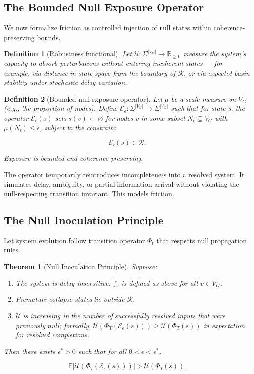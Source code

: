 \documentclass[11pt]{article}
\newtheorem{theorem}{Theorem}
\newtheorem{definition}{Definition}
\theoremstyle{remark}
\begin{document}
\subsection{The Bounded Null Exposure Operator}

We now formalize friction as controlled injection of null states within coherence-preserving bounds.

\begin{definition}[Robustness functional]
Let $\mathcal{U} : \Sigma^{|V_G|} \to \mathbb{R}_{\geq 0}$ measure the system's capacity to absorb perturbations without entering incoherent states — for example, via distance in state space from the boundary of $\mathcal{R}$, or via expected basin stability under stochastic delay variation.
\end{definition}

\begin{definition}[Bounded null exposure operator]
Let $\mu$ be a scale measure on $V_G$ (e.g., the proportion of nodes). Define $\mathcal{E}_\epsilon : \Sigma^{|V_G|} \to \Sigma^{|V_G|}$ such that for state $s$, the operator $\mathcal{E}_\epsilon(s)$ sets $s(v) \leftarrow \varnothing$ for nodes $v$ in some subset $N_\epsilon \subseteq V_G$ with $\mu(N_\epsilon) \leq \epsilon$, subject to the constraint

\[
\mathcal{E}_\epsilon(s) \in \mathcal{R}.
\]

Exposure is bounded and coherence-preserving.
\end{definition}

The operator temporarily reintroduces incompleteness into a resolved system. It simulates delay, ambiguity, or partial information arrival without violating the null-respecting transition invariant. This models friction.

\subsection{The Null Inoculation Principle}

Let system evolution follow transition operator $\Phi_t$ that respects null propagation rules.

\begin{theorem}[Null Inoculation Principle]
\label{thm:nip}
Suppose:
\begin{enumerate}[label=(\roman*)]
  \item The system is delay-insensitive: $\tilde{f}_v$ is defined as above for all $v \in V_G$.
  \item Premature collapse states lie outside $\mathcal{R}$.
  \item $\mathcal{U}$ is increasing in the number of successfully resolved inputs that were previously null; formally, $\mathcal{U}(\Phi_T(\mathcal{E}_\epsilon(s))) \geq \mathcal{U}(\Phi_T(s))$ in expectation for resolved completions.
\end{enumerate}
Then there exists $\epsilon^* > 0$ such that for all $0 < \epsilon < \epsilon^*$,

\[
\mathbb{E}\bigl[\mathcal{U}(\Phi_T(\mathcal{E}_\epsilon(s)))\bigr] > \mathcal{U}(\Phi_T(s)).
\]
\end{theorem}
\end{document}
